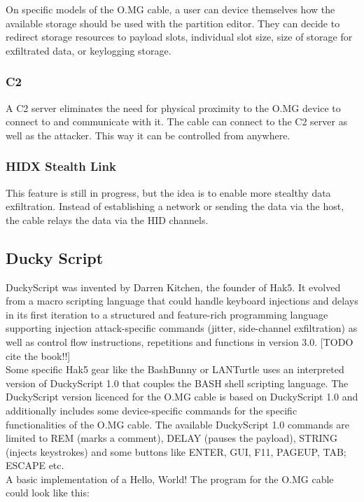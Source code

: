 On specific models of the O.MG cable, a user can device themselves how the available storage should be used with the partition editor. They can decide to redirect storage resources to payload slots, individual slot size, size of storage for exfiltrated data, or keylogging storage. 

\subsubsection{C2}
A C2 server eliminates the need for physical proximity to the O.MG device to connect to and communicate with it. The cable can connect to the C2 server as well as the attacker. This way it can be controlled from anywhere. 

\subsubsection{HIDX Stealth Link}
This feature is still in progress, but the idea is to enable more stealthy data exfiltration. Instead of establishing a network or sending the data via the host, the cable relays the data via the HID channels.  


\subsection{Ducky Script} \label{DuckyScript}

DuckyScript was invented by Darren Kitchen, the founder of Hak5. It evolved from a macro scripting language that could handle keyboard injections and delays in its first iteration to a structured and feature-rich programming language supporting injection attack-specific commands (jitter, side-channel exfiltration) as well as control flow instructions, repetitions and functions in version 3.0. \cite{the book} [TODO cite the book!!] \\
Some specific Hak5 gear like the BashBunny or LANTurtle uses an interpreted version of DuckyScript 1.0 that couples the BASH shell scripting language. \cite{Hak5Usbrubberduckypayloads2024} The DuckyScript version licenced for the O.MG cable is based on DuckyScript 1.0 and additionally includes some device-specific commands for the specific functionalities of the O.MG cable. The available DuckyScript 1.0 commands are limited to REM (marks a comment), DELAY (pauses the payload), STRING (injects keystrokes) and some buttons like ENTER, GUI, F11, PAGEUP, TAB; ESCAPE etc. \\
A basic implementation of a Hello, World! The program for the O.MG cable could look like this:

